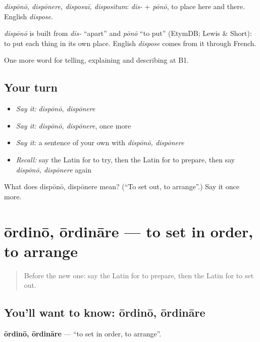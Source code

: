 \emph{dispōnō, dispōnere, disposuī, dispositum}: \emph{dis-} + \emph{pōnō}, to place here and there. English \emph{dispose}.

\begin{cousinweb}
\emph{dispōnō} is built from \emph{dis-} \textquotedblleft{}apart\textquotedblright{} and \emph{pōnō} \textquotedblleft{}to put\textquotedblright{} (EtymDB; Lewis \& Short): to put each thing in its own place. English \emph{dispose} comes from it through French.
\end{cousinweb}

\begin{grammarlens}[title={What you've built}]
One more word for telling, explaining and describing at B1.
\end{grammarlens}

\subsection*{Your turn}
\begin{itemize}
\raggedright
  \item \emph{Say it:} \emph{dispōnō, dispōnere}
  \item \emph{Say it:} \emph{dispōnō, dispōnere}, once more
  \item \emph{Say it:} a sentence of your own with \emph{dispōnō, dispōnere}
  \item \emph{Recall:} say the Latin for to try, then the Latin for to prepare, then say \emph{dispōnō, dispōnere} again
\end{itemize}

\begin{tcolorbox}[breakable,colback=teal!4,colframe=teal!35!black,title={Before you move on}]
What does dispōnō, dispōnere mean? (\textquotedblleft{}To set out, to arrange\textquotedblright{}.) Say it once more.
\end{tcolorbox}
\section[ōrdinō, ōrdināre]{ōrdinō, ōrdināre — to set in order, to arrange}

\label{lesson:LA-C394-ordino}



\begin{quote}
Before the new one: say the Latin for to prepare, then the Latin for to set out.
\end{quote}

\subsection*{You'll want to know: ōrdinō, ōrdināre}
\textbf{ōrdinō, ōrdināre} — \textquotedblleft{}to set in order, to arrange\textquotedblright{}.

